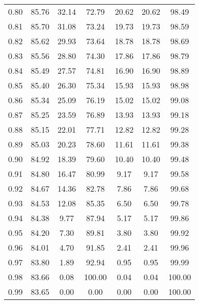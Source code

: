 \begin{tabular}{|c|c|c|c|c|c|c|}
      0.80 &     85.76 &     32.14 &      72.79 &   20.62 &      20.62 &         98.49 \\
      0.81 &     85.70 &     31.08 &      73.24 &   19.73 &      19.73 &         98.59 \\
      0.82 &     85.62 &     29.93 &      73.64 &   18.78 &      18.78 &         98.69 \\
      0.83 &     85.56 &     28.80 &      74.30 &   17.86 &      17.86 &         98.79 \\
      0.84 &     85.49 &     27.57 &      74.81 &   16.90 &      16.90 &         98.89 \\
      0.85 &     85.40 &     26.30 &      75.34 &   15.93 &      15.93 &         98.98 \\
      0.86 &     85.34 &     25.09 &      76.19 &   15.02 &      15.02 &         99.08 \\
      0.87 &     85.25 &     23.59 &      76.89 &   13.93 &      13.93 &         99.18 \\
      0.88 &     85.15 &     22.01 &      77.71 &   12.82 &      12.82 &         99.28 \\
      0.89 &     85.03 &     20.23 &      78.60 &   11.61 &      11.61 &         99.38 \\
      0.90 &     84.92 &     18.39 &      79.60 &   10.40 &      10.40 &         99.48 \\
      0.91 &     84.80 &     16.47 &      80.99 &    9.17 &       9.17 &         99.58 \\
      0.92 &     84.67 &     14.36 &      82.78 &    7.86 &       7.86 &         99.68 \\
      0.93 &     84.53 &     12.08 &      85.35 &    6.50 &       6.50 &         99.78 \\
      0.94 &     84.38 &      9.77 &      87.94 &    5.17 &       5.17 &         99.86 \\
      0.95 &     84.20 &      7.30 &      89.81 &    3.80 &       3.80 &         99.92 \\
      0.96 &     84.01 &      4.70 &      91.85 &    2.41 &       2.41 &         99.96 \\
      0.97 &     83.80 &      1.89 &      92.94 &    0.95 &       0.95 &         99.99 \\
      0.98 &     83.66 &      0.08 &     100.00 &    0.04 &       0.04 &        100.00 \\
      0.99 &     83.65 &      0.00 &       0.00 &    0.00 &       0.00 &        100.00 \\
\bottomrule
\end{tabular}
